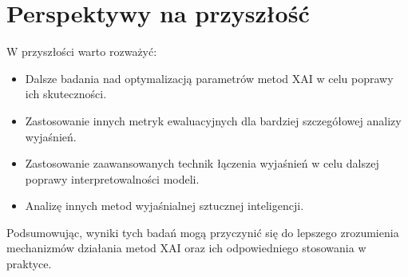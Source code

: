 \section*{Perspektywy na przyszłość}

W przyszłości warto rozważyć:
\begin{itemize}
    \item Dalsze badania nad optymalizacją parametrów metod XAI w celu poprawy ich skuteczności.
    \item Zastosowanie innych metryk ewaluacyjnych dla bardziej szczegółowej analizy wyjaśnień.
    \item Zastosowanie zaawansowanych technik łączenia wyjaśnień w celu dalszej poprawy interpretowalności modeli.
    \item Analizę innych metod wyjaśnialnej sztucznej inteligencji.
\end{itemize}

Podsumowując, wyniki tych badań mogą przyczynić się do lepszego zrozumienia mechanizmów działania metod XAI oraz ich odpowiedniego stosowania w praktyce.
